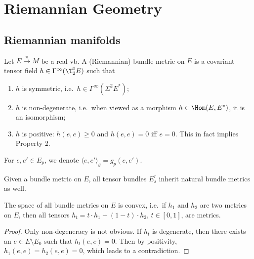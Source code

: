 \clearpage
\section{Riemannian Geometry}

\subsection{Riemannian manifolds}\label{sec: Riemannian mfds}


\begin{defn}
Let $E\overset\pi\to M$ be a real \gls{vb}. A (Riemannian) bundle metric on $E$ is a covariant tensor field $h\in\Gamma^\infty(\T^0_2 E)$ such that
\begin{enumerate}
    \item $h$ is symmetric, i.e.\ $h\in\Gamma^\infty(\Sigma^2 E^\ast)$;
    \item $h$ is non-degenerate, i.e.\ when viewed as a morphism $h\in\Hom(E,E^\ast)$, it is an isomorphism;
    \item $h$ is positive: $h(e,e)\geq 0$ and $h(e,e)=0$ iff $e=0$. This in fact implies Property 2.
\end{enumerate}
For $e,e'\in E_p$, we denote $\langle e,e'\rangle_g=g_p(e,e')$.
\end{defn}

Given a bundle metric on $E$, all tensor bundles $E^r_s$ inherit natural bundle metrics as well.

\begin{prop}
The space of all bundle metrics on $E$ is convex, i.e.\ if $h_1$ and $h_2$ are two metrics on $E$, then all tensors $h_t=t \cdot h_1+(1-t)\cdot h_2$, $t\in[0,1]$, are metrics.
\end{prop}
\begin{proof}
Only non-degeneracy is not obvious. If $h_t$ is degenerate, then there exists an $e\in E\setminus E_0$ such that $h_t(e,e)=0$. Then by positivity, $h_1(e,e)=h_2(e,e)=0$, which leads to a contradiction.
\end{proof}

